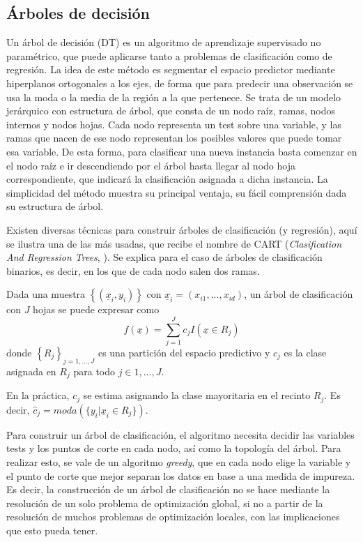 \documentclass[12pt,a4paper,]{book}
\numberwithin{dummy}{section}
\theoremstyle{ocrenumbox}
\theoremstyle{blacknumex}
\theoremstyle{blacknumbox}
\theoremstyle{ocrenum}
\theoremstyle{ocrenum}
\begin{document}
\hypertarget{uxe1rboles-de-decisiuxf3n}{%
\subsection{Árboles de decisión}\label{uxe1rboles-de-decisiuxf3n}}

Un árbol de decisión (DT) es un algoritmo de aprendizaje supervisado no
paramétrico, que puede aplicarse tanto a problemas de clasificación como
de regresión. La idea de este método es segmentar el espacio predictor
mediante hiperplanos ortogonales a los ejes, de forma que para predecir
una observación se usa la moda o la media de la región a la que
pertenece. Se trata de un modelo jerárquico con estructura de árbol, que
consta de un nodo raíz, ramas, nodos internos y nodos hojas. Cada nodo
representa un test sobre una variable, y las ramas que nacen de ese nodo
representan los posibles valores que puede tomar esa variable. De esta
forma, para clasificar una nueva instancia basta comenzar en el nodo
raíz e ir descendiendo por el árbol hasta llegar al nodo hoja
correspondiente, que indicará la clasificación asignada a dicha
instancia. La simplicidad del método muestra su principal ventaja, su
fácil comprensión dada su estructura de árbol.

Existen diversas técnicas para construir árboles de clasificación (y
regresión), aquí se ilustra una de las más usadas, que recibe el nombre
de CART (\emph{Clasification And Regression Trees},
\citet{breiman1984classification}). Se explica para el caso de árboles
de clasificación binarios, es decir, en los que de cada nodo salen dos
ramas.

Dada una muestra \(\left\{ (\underline x_i,y_i) \right\}\) con
\(\underline x_i = (x_{i1},...,x_{id})\), un árbol de clasificación con
\(J\) hojas se puede expresar como
\[f(\underline x) = \sum_{j=1}^J c_j I(\underline x \in R_j)\] donde
\(\left\{ R_j\right\}_{j=1,...,J}\) es una partición del espacio
predictivo y \(c_j\) es la clase asignada en \(R_j\) para todo
\(j \in {1,...,J}\).

En la práctica, \(c_j\) se estima asignando la clase mayoritaria en el
recinto \(R_j\). Es decir,
\(\hat c_j = moda(\{y_i | \underline x_i \in R_j\})\).

Para construir un árbol de clasificación, el algoritmo necesita decidir
las variables tests y los puntos de corte en cada nodo, así como la
topología del árbol. Para realizar esto, se vale de un algoritmo
\emph{greedy}, que en cada nodo elige la variable y el punto de corte
que mejor separan los datos en base a una medida de impureza. Es decir,
la construcción de un árbol de clasificación no se hace mediante la
resolución de un solo problema de optimización global, si no a partir de
la resolución de muchos problemas de optimización locales, con las
implicaciones que esto pueda tener.
\end{document}
